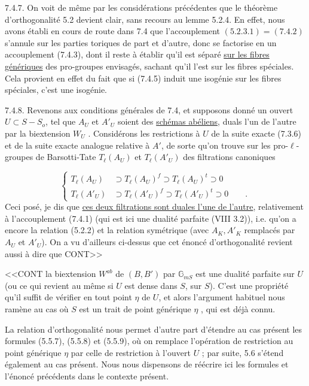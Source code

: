 
7.4.7. On voit de même par les considérations précédentes que le théorème d'orthogonalité 5.2 devient clair, sans recours au lemme 5.2.4. En effet, nous avons établi en cours de route dans 7.4 que l'accouplement $(5.2.3.1)=(7.4.2)$ s'annule sur les parties toriques de part et d'autre, donc se factorise en un accouplement (7.4.3), dont il reste à établir qu'il est séparé \underline{sur les fibres génériques} des pro-groupes envisagés, sachant qu'il l'est sur les fibres spéciales. Cela provient en effet du fait que si (7.4.5) induit une isogénie sur les fibres spéciales, c'est une isogénie.

7.4.8. Revenons aux conditions générales de 7.4, et supposons donné un ouvert $U \subset S-S_o$, tel que $A_U$ et $A'_U$ soient des \underline{schémas abéliens}, duals l'un de l'autre par la biextension $W_U$ . Considérons les restrictions à $U$ de la suite exacte (7.3.6) et de la suite exacte analogue relative à $A'$, de sorte qu'on trouve sur les pro-$\ell$-groupes de Barsotti-Tate $T_\ell(A_U)$ et $T_\ell(A'_U)$ des filtrations canoniques

\begin{equation}\tag{7.4.9}
\left\{\begin{aligned} T_\ell(A_U) &\supset T_\ell(A_U)^f \supset T_\ell(A_U)^t \supset 0 \\[4ex] T_\ell(A'_U) &\supset T_\ell(A'_U)^f \supset T_\ell(A'_U)^t \supset 0 \qquad . \end{aligned}\right.
\end{equation}
Ceci posé, je dis que \underline{ces deux filtrations sont duales l'une de l'autre}, relativement à l'accouplement (7.4.1) (qui est ici une dualité parfaite (VIII 3.2)), i.e. qu'on a encore la relation (5.2.2) et la relation symétrique (avec $A_K,A'_K$ remplacés par $A_U$ et $A'_U$). On a vu d'ailleurs ci-dessus que cet énoncé d'orthogonalité revient aussi à dire que CONT>>



<<CONT la biextension $W^{ab}$ de $(B,B')$ par $\mathbb{G}_{mS}$ est une dualité parfaite sur $U$ (ou ce qui revient au même si $U$ est dense dans $S$, sur $S$). C'est une propriété qu'il suffit de vérifier en tout point $\eta$ de $U$, et alors l'argument habituel nous ramène au cas où $S$ est un trait de point générique $\eta$ , qui est déjà connu.

La relation d'orthogonalité nous permet d'autre part d'étendre au cas présent les formules (5.5.7), (5.5.8) et (5.5.9), où on remplace l'opération de restriction au point générique $\eta$ par celle de restriction à l'ouvert $U$ ; par suite, 5.6 s'étend également au cas présent. Nous nous dispensons de réécrire ici les formules et l'énoncé précédents dans le contexte présent.

